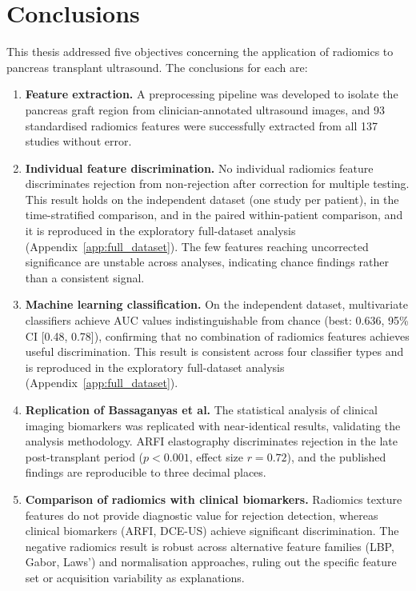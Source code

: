 \section{Conclusions}
\label{sec:conclusions}

This thesis addressed five objectives concerning the application of radiomics to pancreas transplant ultrasound. The conclusions for each are:

\begin{enumerate}

\item \textbf{Feature extraction.} A preprocessing pipeline was developed to isolate the pancreas graft region from clinician-annotated ultrasound images, and 93 standardised radiomics features were successfully extracted from all 137 studies without error.

\item \textbf{Individual feature discrimination.} No individual radiomics feature discriminates rejection from non-rejection after correction for multiple testing. This result holds on the independent dataset (one study per patient), in the time-stratified comparison, and in the paired within-patient comparison, and it is reproduced in the exploratory full-dataset analysis (Appendix~\ref{app:full_dataset}). The few features reaching uncorrected significance are unstable across analyses, indicating chance findings rather than a consistent signal.

\item \textbf{Machine learning classification.} On the independent dataset, multivariate classifiers achieve AUC values indistinguishable from chance (best: 0.636, 95\% CI [0.48, 0.78]), confirming that no combination of radiomics features achieves useful discrimination. This result is consistent across four classifier types and is reproduced in the exploratory full-dataset analysis (Appendix~\ref{app:full_dataset}).

\item \textbf{Replication of Bassaganyas et al.} The statistical analysis of clinical imaging biomarkers was replicated with near-identical results, validating the analysis methodology. ARFI elastography discriminates rejection in the late post-transplant period ($p < 0.001$, effect size $r = 0.72$), and the published findings are reproducible to three decimal places.

\item \textbf{Comparison of radiomics with clinical biomarkers.} Radiomics texture features do not provide diagnostic value for rejection detection, whereas clinical biomarkers (ARFI, DCE-US) achieve significant discrimination. The negative radiomics result is robust across alternative feature families (LBP, Gabor, Laws') and normalisation approaches, ruling out the specific feature set or acquisition variability as explanations.

\end{enumerate}

